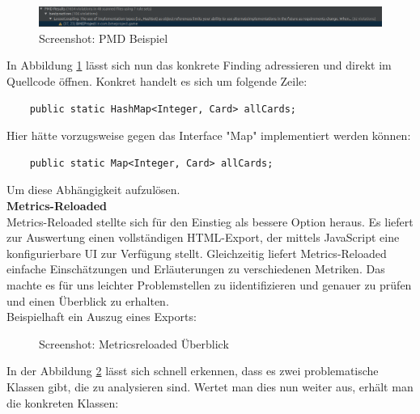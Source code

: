 \begin{figure}
\includegraphics[width=1\textwidth]{../img/sq/pmd2.PNG}
\caption{Screenshot: PMD Beispiel}
\label{fig:Screenshot PMD Beispiel}
\end{figure}
In Abbildung \ref{fig:Screenshot PMD Beispiel} lässt sich nun das konkrete Finding adressieren und direkt im Quellcode öffnen. Konkret handelt es sich um folgende Zeile:
\begin{lstlisting}
	public static HashMap<Integer, Card> allCards;
\end{lstlisting}
Hier hätte vorzugsweise gegen das Interface "Map" implementiert werden können:
\begin{lstlisting}
	public static Map<Integer, Card> allCards;
\end{lstlisting}
Um diese Abhängigkeit aufzulösen.\\
\textbf{Metrics-Reloaded} \cite{Metrics} \\
Metrics-Reloaded stellte sich für den Einstieg als bessere Option heraus. Es liefert zur Auswertung einen vollständigen HTML-Export, der mittels JavaScript eine konfigurierbare UI zur Verfügung stellt. Gleichzeitig liefert Metrics-Reloaded einfache Einschätzungen und Erläuterungen zu verschiedenen Metriken. Das machte es für uns leichter Problemstellen zu iidentifizieren und genauer zu prüfen und einen Überblick zu erhalten.\\
Beispielhaft ein Auszug eines Exports:

\begin{figure}[h]
\centering
\qquad
\caption{Screenshot: Metricsreloaded Überblick}%
 \label{fig: Screenshot Metricsreloaded Überblick}%
\end{figure}
In der Abbildung \ref{fig: Screenshot Metricsreloaded Überblick} lässt sich schnell erkennen, dass es zwei problematische Klassen gibt, die zu analysieren sind.
Wertet man dies nun weiter aus, erhält man die konkreten Klassen:


